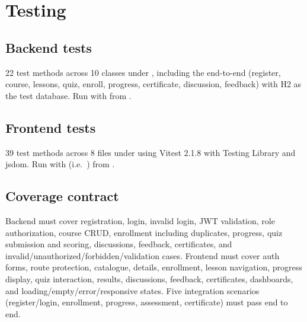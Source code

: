 \section{Testing}
\label{sec:testing}

\subsection{Backend tests}

22 test methods across 10 classes under , including the end-to-end  (register, course, lessons, quiz, enroll, progress, certificate, discussion, feedback) with H2 as the test database. Run with  from .

\subsection{Frontend tests}

39 test methods across 8 files under  using Vitest 2.1.8 with Testing Library and jsdom. Run with  (i.e.\ ) from .

\subsection{Coverage contract}

Backend must cover registration, login, invalid login, JWT validation, role authorization, course CRUD, enrollment including duplicates, progress, quiz submission and scoring, discussions, feedback, certificates, and invalid/unauthorized/forbidden/validation cases. Frontend must cover auth forms, route protection, catalogue, details, enrollment, lesson navigation, progress display, quiz interaction, results, discussions, feedback, certificates, dashboards, and loading/empty/error/responsive states. Five integration scenarios (register/login, enrollment, progress, assessment, certificate) must pass end to end.
